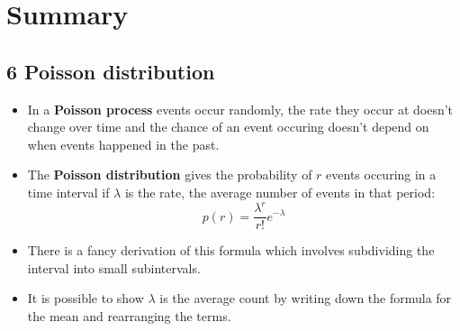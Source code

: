 
\ifind
\section*{Summary}
\else
\subsection*{6 Poisson distribution}
\fi


\begin{itemize}

\item In a \textbf{Poisson process} events occur randomly, the rate
  they occur at doesn't change over time and the chance of an event
  occuring doesn't depend on when events happened in the past.
  
  \item The \textbf{Poisson distribution} gives the probability of $r$
    events occuring in a time interval if $\lambda$ is the rate, the average number of events in that period:
\begin{equation}
p(r)=\frac{\lambda^r}{r!}e^{-\lambda}
\end{equation}    

\item There is a fancy derivation of this formula which involves subdividing the interval into small subintervals.

\item It is possible to show $\lambda$ is the average count by writing down the formula for the mean and rearranging the terms.
  \end{itemize}
